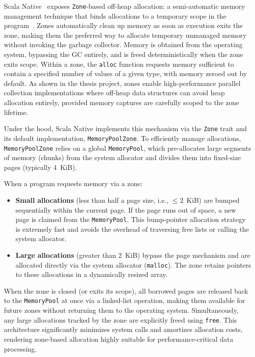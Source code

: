 \documentclass[
  english,   %
  bibtex,    %
]{kththesis}
\begin{document}
Scala Native~\cite{scala_native} exposes \texttt{Zone}-based off-heap allocation: a semi-automatic memory management
technique that binds allocations to a temporary scope in the program~\cite{scala_native_interop}. Zones
automatically clean up memory as soon as execution exits the zone, making them the
preferred way to allocate temporary unmanaged memory without invoking the garbage
collector. Memory is obtained from the operating system, bypassing the \gls{GC} entirely,
and is freed deterministically when the zone exits scope. Within a zone, the \texttt{alloc}
function requests memory sufficient to contain a specified number of values of a given
type, with memory zeroed out by default. As shown in the thesis project, zones enable
high-performance parallel collection implementations where off-heap data structures can
avoid heap allocation entirely, provided memory captures are carefully scoped to the zone
lifetime.

Under the hood, Scala Native implements this mechanism via the \texttt{Zone} trait and its default implementation, \texttt{MemoryPoolZone}. To efficiently manage allocations, \texttt{MemoryPoolZone} relies on a global \texttt{MemoryPool}, which pre-allocates large segments of memory (chunks) from the system allocator and divides them into fixed-size pages (typically 4~KiB).

When a program requests memory via a zone:
\begin{itemize}
    \item \textbf{Small allocations} (less than half a page size, i.e., $\leq 2$~KiB) are bumped sequentially within the current page. If the page runs out of space, a new page is claimed from the \texttt{MemoryPool}. This bump-pointer allocation strategy is extremely fast and avoids the overhead of traversing free lists or calling the system allocator.
    \item \textbf{Large allocations} (greater than 2~KiB) bypass the page mechanism and are allocated directly via the system allocator (\texttt{malloc}). The zone retains pointers to these allocations in a dynamically resized array.
\end{itemize}

When the zone is closed (or exits its scope), all borrowed pages are released back to the \texttt{MemoryPool} at once via a linked-list operation, making them available for future zones without returning them to the operating system. Simultaneously, any large allocations tracked by the zone are explicitly freed using \texttt{free}. This architecture significantly minimizes system calls and amortizes allocation costs, rendering zone-based allocation highly suitable for performance-critical data processing.
\end{document}
